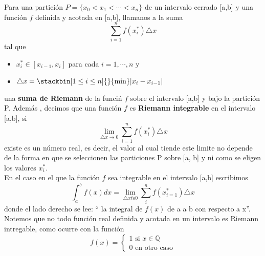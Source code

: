 \documentclass[12pt]{book}
\providecommand{\abs}[1]{\lvert#1\rvert}
\begin{document}
Para una partición $P=\{x_{0}<x_{1}< \cdots < x_{n}\}$ de un intervalo cerrado [a,b] y una función $f$ definida y acotada en [a,b], llamanos a la suma 
\begin{equation}
    \sum_{i=1}^{n}f(x_{i}^{*})\triangle x
\end{equation}
tal que
\begin{itemize}
    \item $x_{i}^{*} \in [x_{i-1},x_{i}]$ para cada $i = 1, \cdots, n$ y 
    \item $\triangle x = \stackbin[1 \leq i \leq n]{}{\min}\abs{x_{i}-x_{i-1}}$
\end{itemize}
una \textbf{suma de Riemann} de la funciń $f$ sobre el intervalo [a,b] y bajo la partición P. Además , decimos que una función $f$ es \textbf{Riemann integrable} en el intervalo [a,b], si 
\begin{equation}
    \lim_{\triangle x \to 0}\sum_{i=1}^{n}f(x_{i}^{*})\triangle x
\end{equation}
existe es un número real, es decir, el valor al cual tiende este limite no depende de la forma en que se seleccionen las particiones P sobre [a, b] y ni como se eligen los valores $x_{i}^{*}$.
 \\
 En el caso en el que la función $f$ sea integrable en el intervalo [a,b] escribimos
 \begin{equation}
     \int_{a}^{b} f(x) dx = \lim_{\triangle x to 0} \sum_{i}^{n}f(x_{i=1}^{*})\triangle x
\end{equation}
donde el lado derecho se lee: `` la integral de $f (x)$ de a a b con respecto
a x''.
\\
Notemos que no todo función real definida y acotada en un intervalo es Riemann intregable, como ocurre con la función 
\begin{equation*}
    f(x) = 
    \begin{cases}
    1 \text{ si } x \in \mathbb{Q} \\
    0  \text{ en otro caso}
    \end{cases}
\end{equation*}
\end{document}
